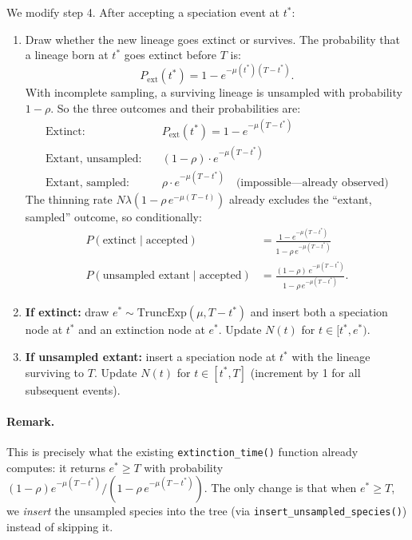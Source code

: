 \documentclass[11pt]{article}
\begin{document}
We modify step 4. After accepting a speciation event at $t^*$:
\begin{enumerate}
\item[4a.] Draw whether the new lineage goes extinct or survives. The probability that a lineage born at $t^*$ goes extinct before $T$ is:
\begin{equation}
P_{\mathrm{ext}}(t^*) = 1 - e^{-\mu(t^*)(T - t^*)}.
\end{equation}
With incomplete sampling, a surviving lineage is unsampled with probability $1 - \rho$. So the three outcomes and their probabilities are:
\begin{align}
\text{Extinct:} \quad & P_{\mathrm{ext}}(t^*) = 1 - e^{-\mu(T-t^*)} \\
\text{Extant, unsampled:} \quad & (1-\rho) \cdot e^{-\mu(T-t^*)} \\
\text{Extant, sampled:} \quad & \rho \cdot e^{-\mu(T-t^*)} \quad \text{(impossible---already observed)}
\end{align}
The thinning rate $N \lambda (1 - \rho\, e^{-\mu(T-t)})$ already excludes the ``extant, sampled'' outcome, so conditionally:
\begin{align}
P(\text{extinct} \mid \text{accepted}) &= \frac{1 - e^{-\mu(T-t^*)}}{1 - \rho\, e^{-\mu(T-t^*)}} \\[4pt]
P(\text{unsampled extant} \mid \text{accepted}) &= \frac{(1-\rho)\, e^{-\mu(T-t^*)}}{1 - \rho\, e^{-\mu(T-t^*)}}.
\end{align}

\item[4b.] \textbf{If extinct:} draw $e^* \sim \mathrm{TruncExp}(\mu, T - t^*)$ and insert both a speciation node at $t^*$ and an extinction node at $e^*$. Update $N(t)$ for $t \in [t^*, e^*)$.

\item[4c.] \textbf{If unsampled extant:} insert a speciation node at $t^*$ with the lineage surviving to $T$. Update $N(t)$ for $t \in [t^*, T]$ (increment by 1 for all subsequent events).
\end{enumerate}

\paragraph{Remark.} This is precisely what the existing \texttt{extinction\_time()} function already computes: it returns $e^* \geq T$ with probability $(1-\rho) e^{-\mu(T-t^*)} / (1 - \rho\, e^{-\mu(T-t^*)})$. The only change is that when $e^* \geq T$, we \emph{insert} the unsampled species into the tree (via \texttt{insert\_unsampled\_species()}) instead of skipping it.
\end{document}
